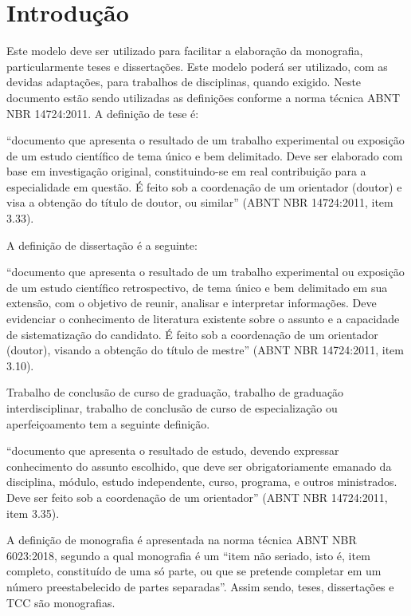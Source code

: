 \chapter{Introdução}
\thispagestyle{empty}

Este modelo deve ser utilizado para facilitar a elaboração da monografia, particularmente teses e dissertações. Este modelo poderá ser utilizado, com as devidas adaptações, para trabalhos de disciplinas, quando exigido.
Neste documento estão sendo utilizadas as definições conforme a norma técnica ABNT NBR 14724:2011. A definição de tese é:
\begin{citacao}
“documento que apresenta o resultado de um trabalho experimental ou exposição de um estudo científico de tema único e bem delimitado. Deve ser elaborado com base em investigação original, constituindo-se em real contribuição para a especialidade em questão. É feito sob a coordenação de um orientador (doutor) e visa a obtenção do título de doutor, ou similar” (ABNT NBR 14724:2011, item 3.33).
\end{citacao}
A definição de dissertação é a seguinte:
\begin{citacao}
“documento que apresenta o resultado de um trabalho experimental ou exposição de um estudo científico retrospectivo, de tema único e bem delimitado em sua extensão, com o objetivo de reunir, analisar e interpretar informações. Deve evidenciar o conhecimento de literatura existente sobre o assunto e a capacidade de sistematização do candidato. É feito sob a coordenação de um orientador (doutor), visando a obtenção do título de mestre” (ABNT NBR 14724:2011, item 3.10).
\end{citacao}
Trabalho de conclusão de curso de graduação, trabalho de graduação interdisciplinar, trabalho de conclusão de curso de especialização ou aperfeiçoamento tem a seguinte definição.
\begin{citacao}
“documento que apresenta o resultado de estudo, devendo expressar conhecimento do assunto escolhido, que deve ser obrigatoriamente emanado da disciplina, módulo, estudo independente, curso, programa, e outros ministrados. Deve ser feito sob a coordenação de um orientador” (ABNT NBR 14724:2011, item 3.35).
\end{citacao}

A definição de monografia é apresentada na norma técnica ABNT NBR 6023:2018, segundo a qual monografia é um “item não seriado, isto é, item completo, constituído de uma só parte, ou que se pretende completar em um número preestabelecido de partes separadas”. Assim sendo, teses, dissertações e TCC são monografias.

